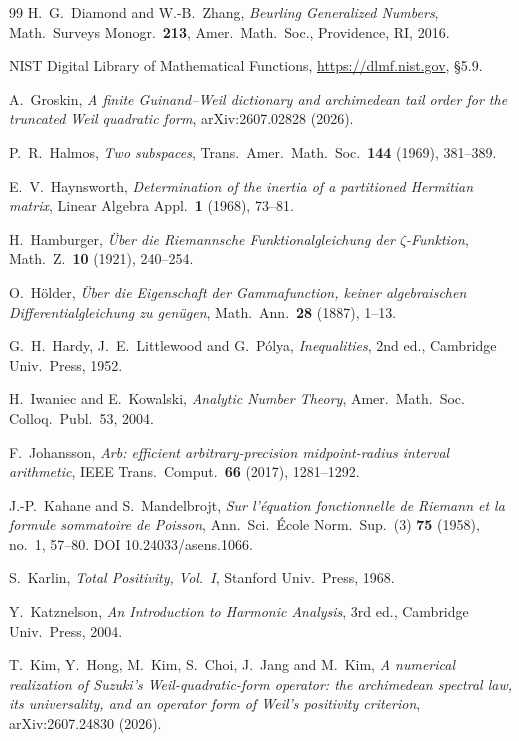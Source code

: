 \documentclass[11pt]{amsart}
\theoremstyle{definition}
\theoremstyle{remark}
\begin{document}
\begin{thebibliography}{99}
 H.~G.~Diamond and W.-B.~Zhang, \emph{Beurling Generalized Numbers}, Math.\ Surveys Monogr.\ \textbf{213}, Amer.~Math.~Soc., Providence, RI, 2016.

 NIST Digital Library of Mathematical Functions, \url{https://dlmf.nist.gov}, \S5.9.

 A.~Groskin, \emph{A finite Guinand--Weil dictionary and archimedean tail
order for the truncated Weil quadratic form}, arXiv:2607.02828 (2026).

 P.~R.~Halmos, \emph{Two subspaces}, Trans.\ Amer.\ Math.\ Soc.\ \textbf{144} (1969), 381--389.

 E.~V.~Haynsworth, \emph{Determination of the inertia of a partitioned Hermitian
matrix}, Linear Algebra Appl.\ \textbf{1} (1968), 73--81.

 H.~Hamburger, \emph{\"Uber die Riemannsche Funktionalgleichung der $\zeta$-Funktion}, Math.\ Z.\ \textbf{10} (1921), 240--254.

 O.~H\"older, \emph{\"Uber die Eigenschaft der Gammafunction, keiner algebraischen Differentialgleichung zu gen\"ugen}, Math.\ Ann.\ \textbf{28} (1887), 1--13.

 G.~H.~Hardy, J.~E.~Littlewood and G.~P\'olya, \emph{Inequalities}, 2nd ed., Cambridge Univ.~Press, 1952.

 H.~Iwaniec and E.~Kowalski, \emph{Analytic Number Theory}, Amer.~Math.~Soc.
Colloq.~Publ.~53, 2004.

 F.~Johansson, \emph{Arb: efficient arbitrary-precision midpoint-radius interval
arithmetic}, IEEE Trans.\ Comput.\ \textbf{66} (2017), 1281--1292.

 J.-P.~Kahane and S.~Mandelbrojt, \emph{Sur l'\'equation fonctionnelle de Riemann et la formule sommatoire de Poisson}, Ann.\ Sci.\ \'Ecole Norm.\ Sup.\ (3) \textbf{75} (1958), no.~1, 57--80. DOI 10.24033/asens.1066.

 S.~Karlin, \emph{Total Positivity, Vol.~I}, Stanford Univ.~Press, 1968.

 Y.~Katznelson, \emph{An Introduction to Harmonic Analysis}, 3rd ed.,
Cambridge Univ.~Press, 2004.

 T.~Kim, Y.~Hong, M.~Kim, S.~Choi, J.~Jang and M.~Kim, \emph{A numerical realization of Suzuki's Weil-quadratic-form operator: the archimedean spectral law, its universality, and an operator form of Weil's positivity criterion}, arXiv:2607.24830 (2026).


\end{thebibliography}
\end{document}
